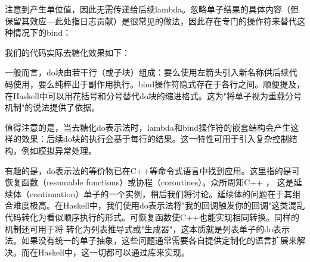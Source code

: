 注意到产生单位值，因此无需传递给后续lambda。忽略单子结果的具体内容（但保留其效应---此处指日志贡献）是很常见的做法，因此存在专门的操作符来替代这种情况下的bind：

我们的代码实际去糖化效果如下：

一般而言，do块由若干行（或子块）组成：要么使用左箭头引入新名称供后续代码使用，要么纯粹出于副作用执行。bind操作符隐式存在于各行之间。顺便提及，在Haskell中可以用花括号和分号替代do块的缩进格式。这为"将单子视为重载分号机制"的说法提供了依据。

值得注意的是，当去糖化do表示法时，lambda和bind操作符的嵌套结构会产生这样的效果：后续do块的执行会基于每行的结果。这一特性可用于引入复杂控制结构，例如模拟异常处理。

有趣的是，do表示法的等价物已在C++等命令式语言中找到应用。这里指的是可恢复函数（resumable functions）或协程（coroutines）。众所周知C++
，
这是延续体（continuation）单子的一个实例，稍后我们将讨论。延续体的问题在于其组合难度极高。在Haskell中，我们使用do表示法将"我的回调触发你的回调"这类混乱代码转化为看似顺序执行的形式。可恢复函数使C++也能实现相同转换。同样的机制还可用于将
转化为列表推导式或"生成器"，这本质就是列表单子的do表示法。如果没有统一的单子抽象，这些问题通常需要各自提供定制化的语言扩展来解决。而在Haskell中，这一切都可以通过库来实现。